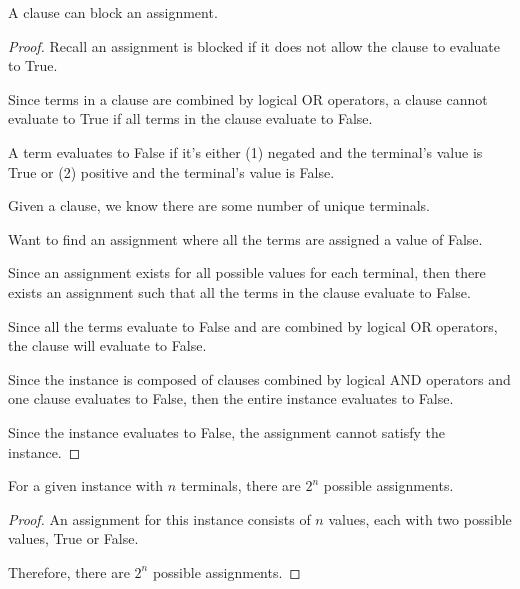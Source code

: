 \documentclass[manuscript]{acmart}
\begin{document}
    \begin{lemma}
        A clause can block an assignment.
    \end{lemma}
    \begin{proof}
        Recall an assignment is blocked if it does not allow the clause to evaluate to True.

        Since terms in a clause are combined by logical OR operators, a clause cannot evaluate to True if all terms in the clause evaluate to False.

        A term evaluates to False if it's either (1) negated and the terminal's value is True or (2) positive and the terminal's value is False.

        Given a clause, we know there are some number of unique terminals.
        
        Want to find an assignment where all the terms are assigned a value of False.

        Since an assignment exists for all possible values for each terminal, then there exists an assignment such that all the terms in the clause evaluate to False.

        Since all the terms evaluate to False and are combined by logical OR operators, the clause will evaluate to False.

        Since the instance is composed of clauses combined by logical AND operators and one clause evaluates to False, then the entire instance evaluates to False.

        Since the instance evaluates to False, the assignment cannot satisfy the instance.
    \end{proof}

    \begin{lemma}        
        For a given instance with $n$ terminals, there are $2^n$ possible assignments.
    \end{lemma}
    \begin{proof}
        An assignment for this instance consists of $n$ values, each with two possible values, True or False.

        Therefore, there are $2^n$ possible assignments.
    \end{proof}
\end{document}
